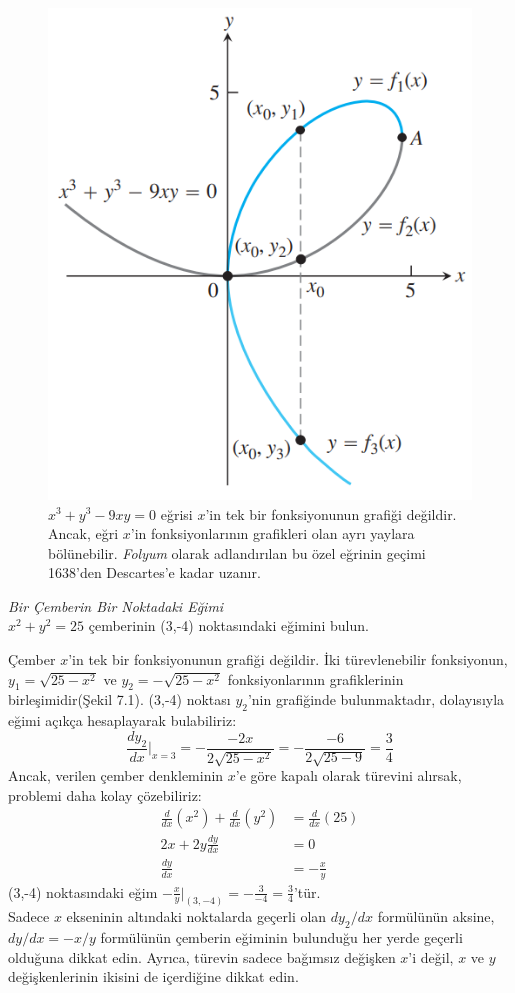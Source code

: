 \begin{figure}[H]
	\centering
	\includegraphics[width=0.5\linewidth]{kapaliturev3.png}
	\caption{$ x^3+y^3-9xy=0$ eğrisi $x$'in tek bir fonksiyonunun grafiği değildir. Ancak, eğri $x$'in fonksiyonlarının grafikleri olan ayrı yaylara bölünebilir. \textit{Folyum} olarak adlandırılan bu özel eğrinin geçimi 1638'den Descartes'e kadar uzanır.}
	\label{fig:ornekresim}
\end{figure}
\begin{ornek}\textit{Bir Çemberin Bir Noktadaki Eğimi}\\
	$x^2+y^2=25$ çemberinin (3,-4) noktasındaki eğimini bulun.
\end{ornek}
\begin{cozum} Çember $x$'in tek bir fonksiyonunun grafiği değildir. İki türevlenebilir fonksiyonun, $y_1=\sqrt{25-x^2}$ ve $y_2=-\sqrt{25-x^2}$ fonksiyonlarının grafiklerinin birleşimidir(Şekil 7.1). (3,-4) noktası $y_2$'nin grafiğinde bulunmaktadır, dolayısıyla eğimi açıkça hesaplayarak bulabiliriz:
	\begin{equation*}
	\frac{dy_2}{dx}|_{x=3}=-\frac{-2x}{2\sqrt{25-x^2}}=-\frac{-6}{2\sqrt{25-9}}=\frac{3}{4}
	\end{equation*}
Ancak, verilen çember denkleminin $x$'e göre kapalı olarak türevini alırsak, problemi daha kolay çözebiliriz:
	\begin{equation*}
	\begin{split}
	\frac{d}{dx}(x^2)+\frac{d}{dx}(y^2)&=\frac{d}{dx}(25)\\
	2x+2y \frac{dy}{dx}&=0\\
	\frac{dy}{dx}&=-\frac{x}{y}
	\end{split}
	\end{equation*}
(3,-4) noktasındaki eğim $\displaystyle - \frac{x}{y}|_{(3,-4)}=-\frac{3}{-4}=\frac{3}{4}$'tür.\\
	Sadece $x$ ekseninin altındaki noktalarda geçerli olan $dy_2/dx$ formülünün aksine, $dy/dx=-x/y$ formülünün çemberin eğiminin bulunduğu her yerde geçerli olduğuna dikkat edin. Ayrıca, türevin sadece bağımsız değişken $x$'i değil, $x$ ve $y$ değişkenlerinin ikisini de içerdiğine dikkat edin.
\end{cozum}\\
